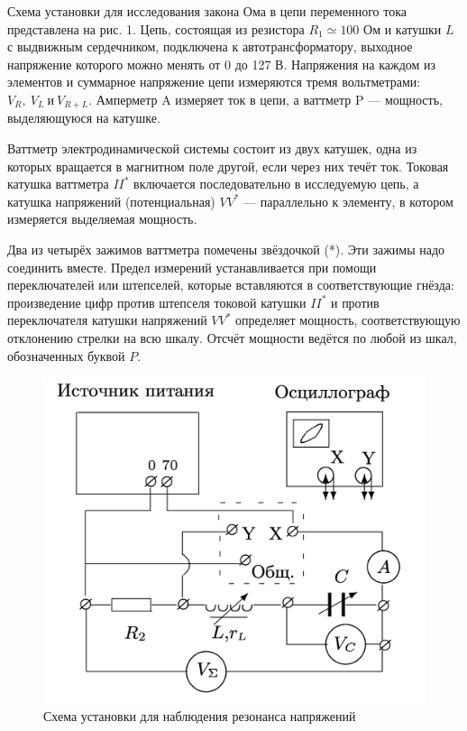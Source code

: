\documentclass[12pt,a4paper]{article}
\begin{document}
Схема установки для исследования закона Ома в цепи переменного тока представлена на рис. 1. 
Цепь, состоящая из резистора $R_1 \simeq 100$ Ом и катушки $L$ с выдвижным сердечником, подключена к автотрансформатору, выходное напряжение которого можно менять от 0 до 127 В. 
Напряжения на каждом из элементов и суммарное напряжение цепи измеряются тремя вольтметрами: $V_R,\ V_L\ и\ V_{R+L}$. 
Амперметр A измеряет ток в цепи, а ваттметр P — мощность, выделяющуюся на катушке.

Ваттметр электродинамической системы состоит из двух катушек, одна из которых вращается в магнитном поле другой, если через них течёт ток. 
Токовая катушка ваттметра $II^*$ включается последовательно в исследуемую цепь, а катушка напряжений (потенциальная) $VV^*$ — параллельно к элементу, в котором измеряется выделяемая мощность.

Два из четырёх зажимов ваттметра помечены звёздочкой (*). 
Эти зажимы надо соединить вместе. 
Предел измерений устанавливается при помощи переключателей или штепселей, которые вставляются в соответствующие гнёзда: произведение цифр против штепселя токовой катушки $II^*$ и против переключателя катушки напряжений $VV^*$ определяет мощность, соответствующую отклонению стрелки на всю шкалу. 
Отсчёт мощности ведётся по любой из шкал, обозначенных буквой $P$.

\begin{figure}
    \centering
    \includegraphics[width=\linewidth]{pics/scheme2.png}
    \caption{Схема установки для наблюдения резонанса напряжений}
\end{figure}
\end{document}
